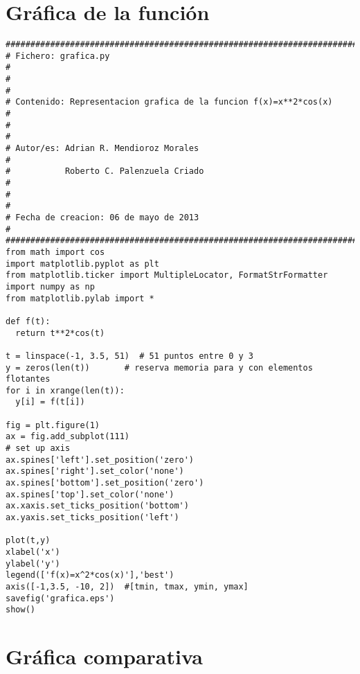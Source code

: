 \section{Gr\'afica de la funci\'on}
\label{Apendice1:grafica1}

\begin{center}
\begin{footnotesize}
\begin{verbatim}
########################################################################
# Fichero: grafica.py                                                  #
#                                                                      #
# Contenido: Representacion grafica de la funcion f(x)=x**2*cos(x)     #
#                                                                      #
# Autor/es: Adrian R. Mendioroz Morales                                #
#           Roberto C. Palenzuela Criado                               #
#                                                                      #
# Fecha de creacion: 06 de mayo de 2013                                #
########################################################################
from math import cos
import matplotlib.pyplot as plt
from matplotlib.ticker import MultipleLocator, FormatStrFormatter
import numpy as np
from matplotlib.pylab import *

def f(t):
  return t**2*cos(t)

t = linspace(-1, 3.5, 51)  # 51 puntos entre 0 y 3
y = zeros(len(t))       # reserva memoria para y con elementos flotantes
for i in xrange(len(t)):
  y[i] = f(t[i])

fig = plt.figure(1)
ax = fig.add_subplot(111) 
# set up axis
ax.spines['left'].set_position('zero')
ax.spines['right'].set_color('none')
ax.spines['bottom'].set_position('zero')
ax.spines['top'].set_color('none')
ax.xaxis.set_ticks_position('bottom')
ax.yaxis.set_ticks_position('left')
 
plot(t,y)
xlabel('x')
ylabel('y')
legend(['f(x)=x^2*cos(x)'],'best')
axis([-1,3.5, -10, 2])  #[tmin, tmax, ymin, ymax]
savefig('grafica.eps')
show()
\end{verbatim}
\end{footnotesize}
\end{center}

\newpage

\section{Gr\'afica comparativa}
\label{Apendice1:grafica2}


